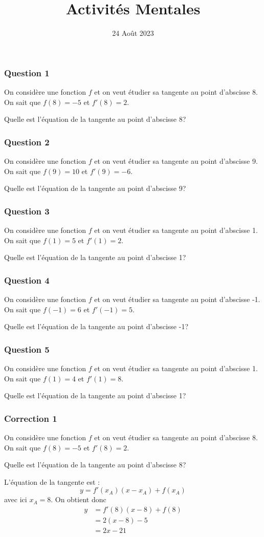 \documentclass[15pt, mathserif]{beamer}
\title{Activités Mentales}
\date{24 Août 2023}
\begin{document}
\begin{frame}
    \titlepage
\end{frame}

\begin{frame} 
	\frametitle{Question 1}
On considère une fonction $f$ et on veut étudier sa tangente au point d'abscisse 8. On sait que $f(8)=-5$ et $f'(8)=2$. 
 
 Quelle est l'équation de la tangente au point d'abscisse 8?\end{frame}


\begin{frame} 
	\frametitle{Question 2}
On considère une fonction $f$ et on veut étudier sa tangente au point d'abscisse 9. On sait que $f(9)=10$ et $f'(9)=-6$. 
 
 Quelle est l'équation de la tangente au point d'abscisse 9?\end{frame}


\begin{frame} 
	\frametitle{Question 3}
On considère une fonction $f$ et on veut étudier sa tangente au point d'abscisse 1. On sait que $f(1)=5$ et $f'(1)=2$. 
 
 Quelle est l'équation de la tangente au point d'abscisse 1?\end{frame}


\begin{frame} 
	\frametitle{Question 4}
On considère une fonction $f$ et on veut étudier sa tangente au point d'abscisse -1. On sait que $f(-1)=6$ et $f'(-1)=5$. 
 
 Quelle est l'équation de la tangente au point d'abscisse -1?\end{frame}


\begin{frame} 
	\frametitle{Question 5}
On considère une fonction $f$ et on veut étudier sa tangente au point d'abscisse 1. On sait que $f(1)=4$ et $f'(1)=8$. 
 
 Quelle est l'équation de la tangente au point d'abscisse 1?\end{frame}


\begin{frame}
\vspace{-10mm}
	\frametitle{Correction 1}
On considère une fonction $f$ et on veut étudier sa tangente au point d'abscisse 8. On sait que $f(8)=-5$ et $f'(8)=2$. 
 
  Quelle est l'équation de la tangente au point d'abscisse 8? 
 
 L'équation de la tangente est : $$y=f'(x_A)(x-x_A) + f(x_A)$$ avec ici $x_A=8$. On obtient donc 
 \begin{align*} 
 y&= f'(8)(x-8)+f(8) \\ 
 &=2(x-8)-5\\ 
 &= 2x-21
 \end{align*}\end{frame}
\end{document}
